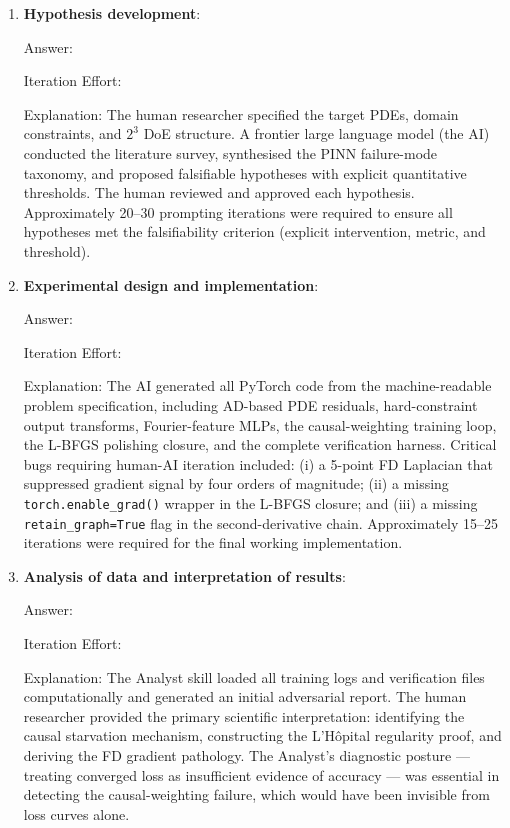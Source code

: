 \documentclass{article}
\begin{document}
\begin{enumerate}

\item \textbf{Hypothesis development}:

Answer: \involvementC{}

Iteration Effort: \iterationMedium{}

Explanation:
The human researcher specified the target PDEs, domain constraints, and
$2^3$ DoE structure.
A frontier large language model (the AI) conducted the literature survey,
synthesised the PINN failure-mode taxonomy, and proposed falsifiable hypotheses
with explicit quantitative thresholds.
The human reviewed and approved each hypothesis.
Approximately 20--30 prompting iterations were required to ensure all
hypotheses met the falsifiability criterion (explicit intervention, metric,
and threshold).

\item \textbf{Experimental design and implementation}:

Answer: \involvementC{}

Iteration Effort: \iterationMedium{}

Explanation:
The AI generated all PyTorch code from the machine-readable problem specification,
including AD-based PDE residuals, hard-constraint output transforms, Fourier-feature
MLPs, the causal-weighting training loop, the L-BFGS polishing closure, and the
complete verification harness.
Critical bugs requiring human-AI iteration included: (i) a 5-point FD Laplacian
that suppressed gradient signal by four orders of magnitude; (ii) a missing
\texttt{torch.enable\_grad()} wrapper in the L-BFGS closure; and (iii) a missing
\texttt{retain\_graph=True} flag in the second-derivative chain.
Approximately 15--25 iterations were required for the final working implementation.

\item \textbf{Analysis of data and interpretation of results}:

Answer: \involvementB{}

Iteration Effort: \iterationMedium{}

Explanation:
The Analyst skill loaded all training logs and verification files computationally
and generated an initial adversarial report.
The human researcher provided the primary scientific interpretation: identifying
the causal starvation mechanism, constructing the L'H\^opital regularity proof,
and deriving the FD gradient pathology.
The Analyst's diagnostic posture — treating converged loss as insufficient
evidence of accuracy — was essential in detecting the causal-weighting failure,
which would have been invisible from loss curves alone.


\end{enumerate}
\end{document}
